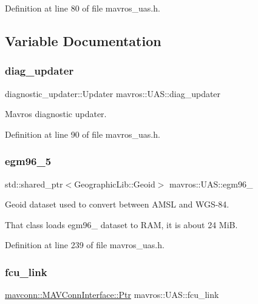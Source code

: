 Definition at line 80 of file mavros\+\_\+uas.\+h.



\subsection{Variable Documentation}
\mbox{\label{group__nodelib_ga57e8229b5f18563820ff4ee5335d57a5}} 
\subsubsection{\texorpdfstring{diag\_updater}{diag\_updater}}
{\footnotesize\ttfamily diagnostic\+\_\+updater\+::\+Updater mavros\+::\+U\+A\+S\+::diag\+\_\+updater}



Mavros diagnostic updater. 



Definition at line 90 of file mavros\+\_\+uas.\+h.

\mbox{\label{group__nodelib_ga35622da9e1bf22e43b269fbcbce65c40}} 
\subsubsection{\texorpdfstring{egm96\_5}{egm96\_5}}
{\footnotesize\ttfamily std\+::shared\+\_\+ptr$<$Geographic\+Lib\+::\+Geoid$>$ mavros\+::\+U\+A\+S\+::egm96\+\_}



Geoid dataset used to convert between A\+M\+SL and W\+G\+S-\/84. 

That class loads egm96\+\_ dataset to R\+AM, it is about 24 MiB. 

Definition at line 239 of file mavros\+\_\+uas.\+h.

\mbox{\label{group__nodelib_gafc058c8fb3e90f26a88fdd808e1b3dac}} 
\subsubsection{\texorpdfstring{fcu\_link}{fcu\_link}}
{\footnotesize\ttfamily \mbox{\hyperlink{group__mavconn_gaff41078b805e1d8f85ed6fd2d87711ce}{mavconn\+::\+M\+A\+V\+Conn\+Interface\+::\+Ptr}} mavros\+::\+U\+A\+S\+::fcu\+\_\+link}



